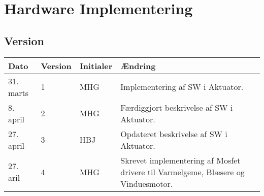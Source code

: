 \chapter{Hardware Implementering} \label{ch:HwImpl}

\section{Version}
\begin{table}[h]
	\centering
	\begin{tabularx}{\textwidth - 2cm}{|l|l|l|X|}
	\hline
	Dato	& Version	& Initialer & Ændring	\\ \hline
	31. marts & 1 & MHG & Implementering af SW i Aktuator. \\ \hline
	8. april & 2 & MHG & Færdiggjort beskrivelse af SW i Aktuator. \\\hline
	27. april & 3 & HBJ & Opdateret beskrivelse af SW i Aktuator. \\\hline
	27. aril & 4 & MHG & Skrevet implementering af Mosfet drivere til Varmelgeme, Blæsere og Vinduesmotor. \\\hline
	\end{tabularx}
\end{table}




